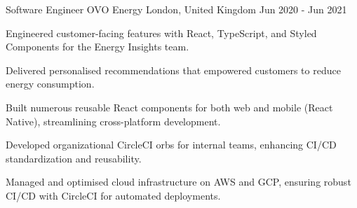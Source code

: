 \begin{cventries}
{\begin{cvitems}
    \end{cvitems}
  }

  \cventry
  {Software Engineer} %
  {OVO Energy} %
  {London, United Kingdom} %
  {Jun 2020 - Jun 2021} %
  {
    \begin{cvitems} %
      \item {Engineered customer-facing features with React, TypeScript, and Styled Components for the Energy Insights team.}
      \item {Delivered personalised recommendations that empowered customers to reduce energy consumption.}
      \item {Built numerous reusable React components for both web and mobile (React Native), streamlining cross-platform development.}
      \item {Developed organizational CircleCI orbs for internal teams, enhancing CI/CD standardization and reusability.}
      \item {Managed and optimised cloud infrastructure on AWS and GCP, ensuring robust CI/CD with CircleCI for automated deployments.}
    \end{cvitems}
  }

\end{cventries}
